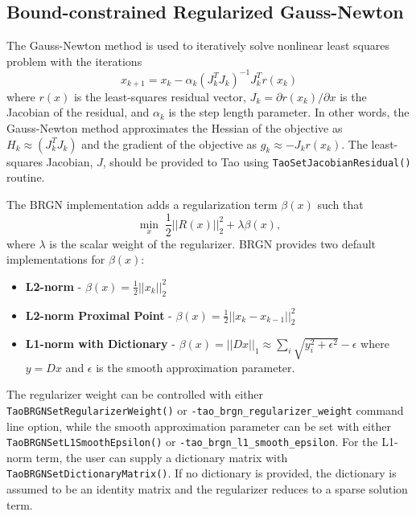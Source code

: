 \subsection{Bound-constrained Regularized Gauss-Newton}

The Gauss-Newton method is used to iteratively solve nonlinear least squares problem with the 
iterations
\begin{equation}
x_{k+1} = x_k - \alpha_k(J_k^T J_k)^{-1} J_k^T r(x_k)
\end{equation}
where $r(x)$ is the least-squares residual vector, $J_k = \partial r(x_k)/\partial x$ is 
the Jacobian of the residual, and $\alpha_k$ is the step length parameter. In other words,
the Gauss-Newton method approximates the Hessian of the objective as $H_k \approx (J_k^T J_k)$ 
and the gradient of the objective as $g_k \approx -J_k r(x_k)$. The least-squares Jacobian, $J$, 
should be provided to Tao using {\tt TaoSetJacobianResidual()} routine.

The BRGN implementation adds a regularization term $\beta(x)$ such that
\begin{equation}
\min_{x} \; \frac{1}{2}||R(x)||_2^2 + \lambda\beta(x),
\end{equation}
where $\lambda$ is the scalar weight of the regularizer. BRGN provides two default implementations 
for $\beta(x)$:
\begin{itemize}
  \item \textbf{L2-norm} - $\beta(x) = \frac{1}{2}||x_k||_2^2$
  \item \textbf{L2-norm Proximal Point} - $\beta(x) = \frac{1}{2}||x_k - x_{k-1}||_2^2$
  \item \textbf{L1-norm with Dictionary} - $\beta(x) = ||Dx||_1 \approx \sum_{i} \sqrt{y_i^2 + \epsilon^2}-\epsilon$ 
        where $y = Dx$ and $\epsilon$ is the smooth approximation parameter.
\end{itemize}
The regularizer weight can be controlled with either {\tt TaoBRGNSetRegularizerWeight()} or 
{\tt -tao\_brgn\_regularizer\_weight} command line option, while the smooth approximation parameter can be set 
with either {\tt TaoBRGNSetL1SmoothEpsilon()} or {\tt -tao\_brgn\_l1\_smooth\_epsilon}. For the L1-norm term, 
the user can supply a dictionary matrix with {\tt TaoBRGNSetDictionaryMatrix()}. If no dictionary 
is provided, the dictionary is assumed to be an identity matrix and the regularizer reduces to a 
sparse solution term.


